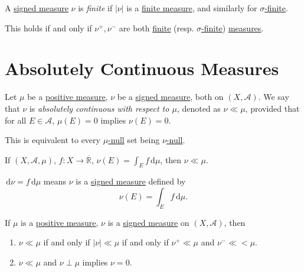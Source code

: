 \begin{definition}\label{def:finite-signed-measure}
	A \hyperref[def:signed-measure]{signed measure} \(\nu\) is \emph{finite} if \(\left\vert \nu \right\vert\) is a \hyperref[def:finite-measure]{finite measure},
	and similarly for \hyperref[def:sigma-finite-measure]{\(\sigma\)-finite}.
\end{definition}
\begin{remark}
	This holds if and only if \(\nu^+,\nu^-\) are both \hyperref[def:finite-measure]{finite} (resp. \hyperref[def:sigma-finite-measure]{\(\sigma\)-finite})
	\hyperref[def:measure]{measures}.
\end{remark}

\section{Absolutely Continuous Measures}
\begin{definition}\label{def:absolutely-continuous}
	Let \(\mu\) be a \hyperref[def:signed-measure]{positive measure}, \(\nu\) be a \hyperref[def:signed-measure]{signed measure}, both on \((X, \mathcal{A})\). We say that \(\nu\) is
	\emph{absolutely continuous with respect to \(\mu\)}, denoted as \(\nu \ll \mu\), provided that for all \(E \in \mathcal{A}\), \(\mu(E) = 0\) implies \(\nu(E) = 0\).
\end{definition}
\begin{remark}
	This is equivalent to every \hyperref[def:null-set-for-a-signed-measure]{\(\mu\)-null} set being \hyperref[def:null-set-for-a-signed-measure]{\(\nu\)-null}.
\end{remark}
\begin{eg}
	If \((X ,\mathcal{A}, \mu)\), \(f \colon X \to \overline{\mathbb{R}}\), \(\nu(E) = \int_E f \,\mathrm{d} \mu\), then \(\nu \ll \mu\).
\end{eg}

\begin{notation}
	\(\,\mathrm{d} \nu = f \,\mathrm{d} \mu\) means \(\nu\) is a \hyperref[def:signed-measure]{signed measure} defined by
	\[
		\nu(E) = \int_E f \,\mathrm{d} \mu.
	\]
\end{notation}

\begin{lemma}
	If \(\mu\) is a \hyperref[def:signed-measure]{positive measure}, \(\nu\) is a \hyperref[def:signed-measure]{signed measure} on \((X, \mathcal{A})\), then
	\begin{enumerate}
		\item \(\nu \ll \mu\) if and only if \(\left\vert \nu \right\vert \ll \mu\) if and only if \(\nu^+ \ll \mu\) and \(\nu^- \ll< \mu\).
		\item \(\nu \ll \mu\) and \(\nu \perp \mu\) implies \(\nu = 0\).
	\end{enumerate}
\end{lemma}

